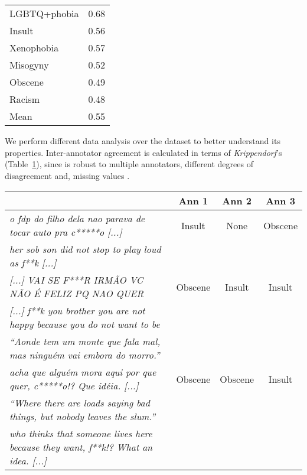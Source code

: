 \documentclass[11pt,a4paper]{article}
\begin{document}
\begin{table}[!ht]
    \centering
    \begin{tabular}{@{}lr@{}}
    \toprule
                 &  \\ \midrule
    LGBTQ+phobia & 0.68  \\
    Insult       & 0.56  \\
    Xenophobia   & 0.57  \\
    Misogyny     & 0.52  \\
    Obscene      & 0.49  \\
    Racism       & 0.48  \\ \midrule
    Mean         & 0.55  \\ \bottomrule
    \end{tabular}
     \label{tab:kappa}
\end{table}


We perform different data analysis over the dataset to better understand its properties. Inter-annotator agreement is calculated in terms of \textit{Krippendorf}’s  (Table~\ref{tab:kappa}), since  is robust to multiple annotators, different degrees of disagreement and, missing values \cite{artstein-poesio-2008-survey}. 


\begin{table*}[!ht]
\centering
\setlength{\tabcolsep}{2pt}
\begin{tabular}{@{}p{11.3cm}ccc@{}}
\toprule
           & Ann 1 & Ann 2 & Ann 3 \\ \midrule
\textit{o fdp do filho dela nao parava de tocar auto pra c*****o [...]} & Insult      & None        & Obscene     \\
\footnotesize{\textit{her sob son did not stop to play loud as f**k [...]}} & & & \\
\hline
\textit{[...] VAI SE F***R IRMÃO VC NÃO É FELIZ PQ NAO QUER}  & Obscene     & Insult      & Insult      \\
\footnotesize{\textit{[...] f**k you brother you are not happy because you do not want to be}} & & & \\
\hline
\textit{``Aonde tem um monte que fala mal, mas ninguém vai embora do morro.''}\\ \textit{acha que alguém mora aqui por que quer, c*****o!? Que idéia. [...]} & Obscene     & Obscene     & Insult      \\ 

\footnotesize{\textit{``Where there are loads saying bad things, but nobody leaves the slum.''}} \\ \footnotesize{\textit{who thinks that someone lives here because they want, f**k!? What an idea. [...] }} & & & \\

\bottomrule
\end{tabular}
\label{tab:divergence}
\end{table*}
\end{document}
